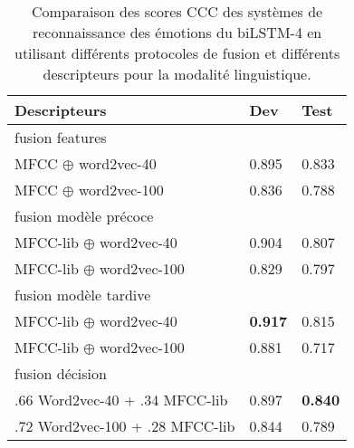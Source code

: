 \begin{table}[h]
  \centering
  \begin{tabular}{|l|l|l|}
  \hline
  Descripteurs   &Dev   &Test  \\
  \hline
  \multicolumn{3}{|l|}{fusion features} \\
  \hline
  MFCC $\oplus$ word2vec-40        &0.895  & 0.833 \\
  MFCC $\oplus$ word2vec-100        &0.836  & 0.788 \\
  \hline
  \multicolumn{3}{|l|}{fusion modèle précoce} \\
  \hline
  MFCC-lib $\oplus$ word2vec-40       & 0.904 & 0.807 \\
  MFCC-lib $\oplus$ word2vec-100       & 0.829 & 0.797 \\
  \hline
  \multicolumn{3}{|l|}{fusion modèle tardive}   \\
  \hline
  MFCC-lib $\oplus$ word2vec-40    & \textbf{0.917}  & 0.815  \\
  MFCC-lib $\oplus$ word2vec-100    & 0.881  & 0.717  \\
  \hline
  \multicolumn{3}{|l|}{fusion décision} \\
  \hline
  .66 Word2vec-40 + .34 MFCC-lib     &0.897  &\textbf{0.840}  \\
  .72 Word2vec-100 + .28 MFCC-lib    &0.844 & 0.789 \\
  \hline
\end{tabular}
\caption{Comparaison des scores CCC des systèmes de reconnaissance des émotions du biLSTM-4 en utilisant différents protocoles de fusion et différents descripteurs pour la modalité linguistique.}
\label{tab:res_fusion}
\end{table}
